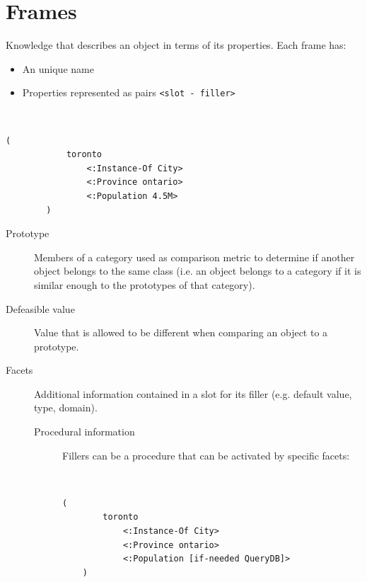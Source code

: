 \section{Frames}
Knowledge that describes an object in terms of its properties.
Each frame has:
\begin{itemize}
    \item An unique name
    \item Properties represented as pairs \texttt{<slot - filler>}
\end{itemize}

\begin{example}
    \phantom{}\\[-1em]
    \begin{lstlisting}[mathescape=true, language={}] 
        (
            toronto
                <:Instance-Of City>
                <:Province ontario>
                <:Population 4.5M>
        )
    \end{lstlisting}
\end{example}

\begin{description}
    \item[Prototype] 
        Members of a category used as comparison metric to determine if another object belongs to the same class
        (i.e. an object belongs to a category if it is similar enough to the prototypes of that category).

    \item[Defeasible value] 
        Value that is allowed to be different when comparing an object to a prototype.

    \item[Facets] 
        Additional information contained in a slot for its filler (e.g. default value, type, domain).

        \begin{description}
            \item[Procedural information] 
                Fillers can be a procedure that can be activated by specific facets:
                \begin{example}
                    \phantom{}\\[-1em]
                    \begin{lstlisting}[mathescape=true, language={}] 
    (
        toronto
            <:Instance-Of City>
            <:Province ontario>
            <:Population [if-needed QueryDB]>
    )
                    \end{lstlisting}
                \end{example}
        \end{description}
\end{description}
